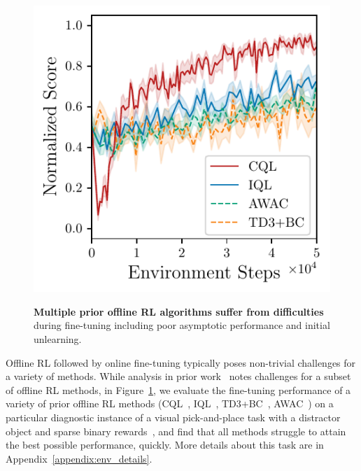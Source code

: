 \begin{figure}
\vspace{-1.0cm}
\begin{center}
{\includegraphics[width=0.78\linewidth]{chapters/cal_ql/figs-sample/sec41-final-utd5.pdf}}
\vspace{-0.3cm}
\caption{\label{fig:cql_iql_finetune}\footnotesize{\textbf{Multiple prior offline RL algorithms suffer from difficulties} during fine-tuning including poor asymptotic performance and initial unlearning.}}
\vspace{-0.7cm}
\end{center}
\end{figure}
Offline RL followed by online fine-tuning typically poses non-trivial challenges for a variety of methods. While analysis in prior work~\citep{nair2020accelerating} notes challenges for a subset of offline RL methods, in Figure~\ref{fig:cql_iql_finetune}, we evaluate the fine-tuning performance of a variety of prior offline RL methods (CQL~\citep{kumar2020conservative}, IQL~\citep{kostrikov2021offlineb}, TD3+BC~\citep{fujimoto2021minimalist}, AWAC~\citep{nair2020accelerating}) on a particular diagnostic instance of a visual pick-and-place task with a distractor object and sparse binary rewards~\citep{singh2020cog}, and find that all methods struggle to attain the best possible performance, quickly. More details about this task are in Appendix~\ref{appendix:env_details}. 

